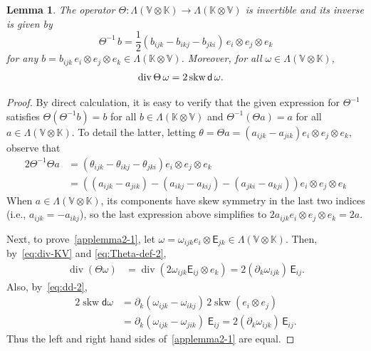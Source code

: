 \documentclass[12pt]{amsart}
\numberwithin{equation}{section}
\newcommand{\og}{\omega}
\newtheorem{lemma}[theorem]{Lemma}
\theoremstyle{definition}
\theoremstyle{remark}
\newcommand{\V}{\mathbb{V}}
\newcommand{\K}{\mathbb{K}}
\renewcommand{\(}{\bigl(}
\renewcommand{\)}{\bigr)}
\renewcommand\div{\operatorname{div}}
\newcommand{\EK}{\mathsf{E}}
\newcommand{\dd}{\mathsf{d}}
\newcommand{\dive}{{\ensuremath\mathop{\mathrm{div}\,}}} %
\newcommand\skw{\operatorname{skw}}
\begin{document}
\begin{lemma}
  The operator
  $ \Theta: \Lambda(\V \otimes \K) \rightarrow \Lambda(\K \otimes \V)$
  is invertible and  its inverse is given by
  \[
    \Theta^{-1}\, b
    = \frac 1 2 (b_{ijk} - b_{ikj} - b_{jki}) \,e_i \otimes e_j \otimes e_k
  \]
  for any $b = b_{ijk} \, e_i \otimes e_j \otimes e_k\in \Lambda(\K \otimes \V)$.
  Moreover, for all $\omega \in \Lambda(\V \otimes \K)$, 
  \begin{align}
    \dive \Theta \,\omega 
    & = 2 \skw \dd \,\omega. 
      \label{applemma2-1}       
  \end{align}
\end{lemma}
\begin{proof}
  By direct calculation, it is easy to verify that the given
  expression for $\Theta^{-1}$ satisfies $ \Theta (\Theta^{-1} b) = b$
  for all $b \in \Lambda(\K \otimes \V)$ and $ \Theta^{-1} (\Theta a) = a$ for all
  $a \in \Lambda(\V \otimes \K)$. To detail the latter, letting
  $\theta = \Theta a = (a_{ijk} - a_{jik}) e_i \otimes e_j \otimes
  e_k,$ observe that
  \begin{align*}
    2 \Theta^{-1} \Theta a
    &= 
      (\theta_{ijk} - \theta_{ikj} - \theta_{jki}) e_i \otimes e_j \otimes   e_k
    \\
    & =
      ( (a_{ijk} - a_{jik}) - (a_{ikj} - a_{kij}) - (a_{jki} - a_{kji})
      ) e_i \otimes e_j \otimes  e_k
  \end{align*}
  When $a \in \Lambda(\V \otimes \K)$, its components have skew
  symmetry in the last two indices (i.e., $a_{ijk} = -a_{ikj}$), so
  the last expression above simplifies to
  $2a_{ijk} e_i \otimes e_j \otimes e_k = 2a$.

  Next, to prove~\eqref{applemma2-1}, let
  $\og = \omega_{ijk} e_i \otimes \EK_{jk}\in \Lambda( \V \otimes
  \K)$. Then, by~\eqref{eq:div-KV} and \eqref{eq:Theta-def-2}, 
  \begin{align*}
    \div (\Theta \omega)
    &  %
      = \div( 2\omega_{ijk} \EK_{ij} \otimes e_k)
     = 2(\partial_k \omega_{ijk})\, \EK_{ij}.
  \end{align*}
  Also, by~\eqref{eq:dd-2}, 
  \begin{align*}
    2\skw  \dd \omega
    & 
      =  \partial_k (\omega_{ijk} - \omega_{ikj}) \,2 \skw(e_i \otimes e_j)
    \\
    &  = \partial_k (\omega_{ijk} - \omega_{jik}) \; \EK_{ij} 
      = 2(\partial_k \omega_{ijk})\, \EK_{ij}.
  \end{align*}
  Thus the left and right hand sides of~\eqref{applemma2-1} are equal.
\end{proof}
\end{document}
